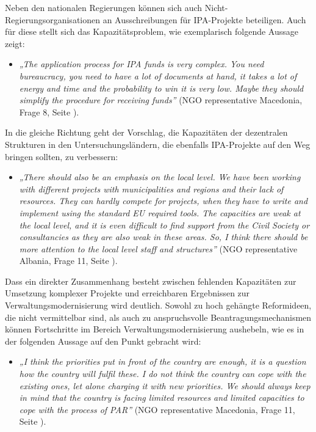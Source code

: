 Neben den nationalen Regierungen können sich auch Nicht-Regierungsorganisationen an Ausschreibungen für IPA-Projekte beteiligen. Auch für diese stellt sich das Kapazitätsproblem, wie exemplarisch folgende Aussage zeigt:
\begin{itemize}[label={}]
\item \textit{„The application process for IPA funds is very complex. You need bureaucracy, you need to have a lot of documents at hand, it takes a lot of energy and time and the probability to win it is very low. Maybe they should simplify the procedure for receiving funds”} (NGO representative Macedonia, Frage 8, Seite \pageref{sec:par technical}).
\end{itemize}
In die gleiche Richtung geht der Vorschlag, die Kapazitäten der dezentralen Strukturen in den Untersuchungsländern, die ebenfalls IPA-Projekte auf den Weg bringen sollten, zu verbessern:
\begin{itemize}[label={}]
\item \textit{„There should also be an emphasis on the local level. We have been working with different projects with municipalities and regions and their lack of resources. They can hardly compete for projects, when they have to write and implement using the standard EU required tools. The capacities are weak at the local level, and it is even difficult to find support from the Civil Society or consultancies as they are also weak in these areas. So, I think there should be more attention to the local level staff and structures”} (NGO representative Albania, Frage 11, Seite \pageref{sec:par priorities}).
\end{itemize}
Dass ein direkter Zusammenhang besteht zwischen fehlenden Kapazitäten zur Umsetzung komplexer Projekte und erreichbaren Ergebnissen zur Verwaltungsmodernisierung wird deutlich. Sowohl zu hoch gehängte Reformideen, die nicht vermittelbar sind, als auch zu anspruchsvolle Beantragungsmechanismen können Fortschritte im Bereich Verwaltungsmodernisierung aushebeln, wie es in der folgenden Aussage auf den Punkt gebracht wird:
\begin{itemize}[label={}]
\item \textit{„I think the priorities put in front of the country are enough, it is a question how the country will fulfil these. I do not think the country can cope with the existing ones, let alone charging it with new priorities. We should always keep in mind that the country is facing limited resources and limited capacities to cope with the process of PAR”} (NGO representative Macedonia, Frage 11, Seite \pageref{sec:par priorities}).
\end{itemize}
